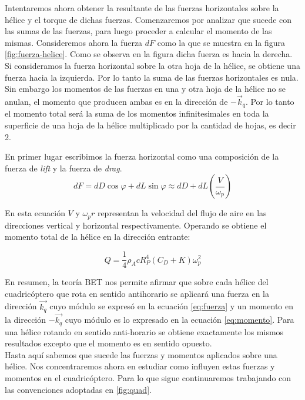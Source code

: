 \documentclass[main]{subfiles}
\begin{document}
Intentaremos ahora obtener la resultante de las fuerzas horizontales sobre la h\'elice y el torque de dichas fuerzas. Comenzaremos por analizar que sucede con las sumas de las fuerzas, para luego proceder a calcular el momento de las mismas. Consideremos ahora la fuerza $dF$ como la que se muestra en la figura \ref{fig:fuerza-helice}. Como se observa en la figura dicha fuerza es hacia la derecha. Si consideramos la fuerza horizontal sobre la otra hoja de la h\'elice, se obtiene una fuerza hacia la izquierda. Por lo tanto la suma de las fuerzas horizontales es nula. Sin embargo los momentos de las fuerzas en una y otra hoja de la h\'elice no se anulan, el momento que producen ambas es en la direcci\'on de $-\vec{k}_q$. Por lo tanto el momento total ser\'a la suma de los momentos infinitesimales en toda la superficie de una hoja de la h\'elice multiplicado por la cantidad de hojas, es decir 2. 

En primer lugar escribimos la fuerza horizontal como una composici\'on de la fuerza de \emph{lift} y la fuerza de \emph{drag}. 
$$dF=dD\cos\varphi+dL\sin\varphi \approx dD +dL\left(\frac{V}{\omega_p}\right)$$

En esta ecuaci\'on $V$ y $\omega_p r$ representan la velocidad del flujo de aire en las direcciones vertical y horizontal respectivamente. Operando se obtiene el momento total de la h\'elice en la direcci\'on entrante:

\begin{equation}
\label{eq:momento}
Q=\frac{1}{4}\rho_A c R_P^4(C_D+K)\omega_p^2
\end{equation}

 

En resumen, la teor\'ia BET nos permite afirmar que sobre cada h\'elice del cuadric\'optero que rota en sentido antihorario se aplicar\'a una fuerza en la direcci\'on $\vec{k_q}$ cuyo m\'odulo se expres\'o en la ecuaci\'on \ref{eq:fuerza} y un momento en la direcci\'on $-\vec{k_q}$ cuyo m\'odulo es lo expresado en la ecuaci\'on \ref{eq:momento}. Para una h\'elice rotando en sentido anti-horario se obtiene exactamente los mismos resultados excepto que el momento es en sentido opuesto.\\

Hasta aqu\'i sabemos que sucede las fuerzas y momentos aplicados sobre una h\'elice. Nos concentraremos ahora en estudiar como influyen estas fuerzas y momentos en el cuadric\'optero. Para lo que sigue continuaremos trabajando con las convenciones adoptadas en \ref{fig:quad}. 
 
\end{document}
